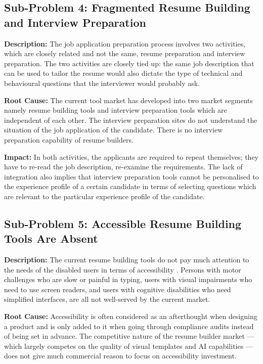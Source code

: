 \documentclass[12pt, a4paper, oneside]{report}
\begin{document}
\subsection{Sub-Problem 4: Fragmented Resume Building and Interview Preparation}

\textbf{Description:} The job application preparation process involves two activities, which are closely related and not the same, resume preparation and interview preparation. The two activities are closely tied up: the same job description that can be used to tailor the resume would also dictate the type of technical and behavioural questions that the interviewer would probably ask.

\textbf{Root Cause:} The current tool market has developed into two market segments namely resume building tools and interview preparation tools which are independent of each other. The interview preparation sites do not understand the situation of the job application of the candidate. There is no interview preparation capability of resume builders.

\textbf{Impact:} In both activities, the applicants are required to repeat themselves; they have to re-read the job description, re-examine the requirements. The lack of integration also implies that interview preparation tools cannot be personalised to the experience profile of a certain candidate in terms of selecting questions which are relevant to the particular experience profile of the candidate.

\subsection{Sub-Problem 5: Accessible Resume Building Tools Are Absent}

\textbf{Description:} The current resume building tools do not pay much attention to the needs of the disabled users in terms of accessibility \cite{wcag21}. Persons with motor challenges who are slow or painful in typing\cite{sears2003}, users with visual impairments who need to use screen readers, and users with cognitive disabilities who need simplified interfaces, are all not well-served by the current market.

\textbf{Root Cause:} Accessibility is often considered as an afterthought when designing a product and is only added to it when going through compliance audits instead of being set in advance. The competitive nature of the resume builder market --- which largely competes on the quality of visual templates and AI capabilities --- does not give much commercial reason to focus on accessibility investment.
\end{document}
